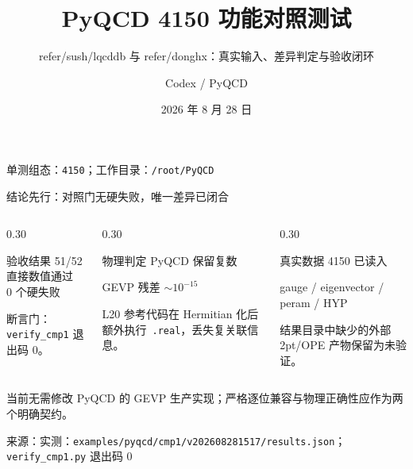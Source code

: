 \documentclass[UTF8,aspectratio=169,11pt]{ctexbeamer}
\title[PyQCD 4150 功能对照]{PyQCD 4150 功能对照测试}
\subtitle{\small refer/sush/lqcddb 与 refer/donghx：真实输入、差异判定与验收闭环}
\author[Codex]{Codex / PyQCD}
\institute{格点 QCD：梯度流重整化核子胶子 TMD-PDF}
\date{2026 年 8 月 28 日}
\newcommand{\source}[1]{\vspace{0.05em}\par{\raggedright\scriptsize\color{muted}来源：#1\par}}
\begin{document}
\begin{frame}[plain]
  \titlepage
  \vfill
  \begin{center}
    \small 单测组态：\texttt{4150}；工作目录：\texttt{/root/PyQCD}
  \end{center}
\end{frame}

\begin{frame}[t]{结论先行：对照门无硬失败，唯一差异已闭合}
  \begin{columns}[T,totalwidth=\textwidth]
    \begin{column}{0.30\textwidth}
      \begin{block}{验收结果}
        \centering
        {\Large\textcolor{evidence}{51/52}}\\[-0.1em]
        直接数值通过\\
        \textcolor{evidence}{0 个硬失败}
      \end{block}
      \small 断言门：\texttt{verify\_cmp1} 退出码 0。
    \end{column}
    \begin{column}{0.30\textwidth}
      \begin{block}{物理判定}
        \centering
        \textcolor{evidence}{PyQCD 保留复数}\par
        \textcolor{evidence}{GEVP 残差 $\sim10^{-15}$}
      \end{block}
      \small L20 参考代码在 Hermitian 化后额外执行 \,\texttt{.real}，丢失复关联信息。
    \end{column}
    \begin{column}{0.30\textwidth}
      \begin{block}{真实数据}
        \centering
        \textcolor{evidence}{4150 已读入}\par
        gauge / eigenvector / peram / HYP
      \end{block}
      \small 结果目录中缺少的外部 2pt/OPE 产物保留为未验证。
    \end{column}
  \end{columns}
  \vfill
  \begin{center}
    \colorbox{good}{\parbox{0.90\linewidth}{\centering
      当前无需修改 PyQCD 的 GEVP 生产实现；严格逐位兼容与物理正确性应作为两个明确契约。}}
  \end{center}
  \source{实测：\texttt{examples/pyqcd/cmp1/v202608281517/results.json}；\texttt{verify\_cmp1.py} 退出码 0}
\end{frame}
\end{document}

